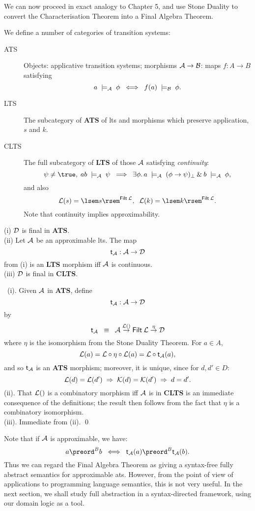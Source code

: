 We can now proceed in exact analogy to Chapter 5, and use Stone Duality to convert the Characterisation Theorem into a Final Algebra Theorem.
\begin{definition}
{\rm We define a number of categories of transition systems:
\begin{description}
\item[ATS] Objects: applicative transition systems; morphisms ${\cal A} \rightarrow {\cal B}$: maps $f : A \rightarrow B$ satisfying
\[ a \; \models_{\cal A} \; \phi \;\; \Longleftrightarrow \;\; f(a) \; \models_{\cal B} \; \phi . \]
\item[LTS] The subcategory of {\bf ATS} of lts and morphisms which preserve application, $s$ and $k$.
\item[CLTS] The full subcategory of {\bf LTS} of those $\cal A$ satisfying {\em continuity}:
\[ \psi \neq \true , \; a b \; \models_{\cal A} \; \psi \;\; \Longrightarrow \;\; \exists \phi . \, a \; \models_{\cal A} \; (\phi \rightarrow \psi )_{\bot} \: \& 
\: b \; \models_{\cal A} \; \phi , \]
and also
\[ {\cal L}(s) = \lsem s \rsem^{{\sf Filt} \: {\cal L}} , \;\; {\cal L}(k) = \lsem k \rsem^{{\sf Filt} \: {\cal L}} . \]
Note that continuity implies approximability.
\end{description}}
\end{definition}
\begin{theorem}
(i) $\cal D$ is final in {\bf ATS}. \\
(ii) Let $\cal A$ be an approximable lts. The map
\[ {\sf t}_{\cal A} : {\cal A} \rightarrow {\cal D} \]
from (i) is an {\bf LTS} morphism iff $\cal A$ is continuous. \\
(iii) $\cal D$ is final in {\bf CLTS}.
\end{theorem}

\proof\  (i). Given $\cal A$ in {\bf ATS}, define
\[ {\sf t}_{\cal A} : {\cal A} \rightarrow {\cal D} \]
by
\[ {\sf t}_{\cal A} \;\; \equiv \;\; {\cal A} \stackrel{{\cal L}()}{\rightarrow} {\sf Filt} \: {\cal L} \stackrel{\eta}{\rightarrow} {\cal D} \]
where $\eta$ is the isomorphism from the Stone Duality Theorem. For $a \in A$,
\[ {\cal L}(a) = {\cal L} \circ \eta \circ {\cal L}(a) = {\cal L} \circ {\sf t}_{\cal A}(a) , \]
and so ${\sf t}_{\cal A}$ is an {\bf ATS} morphism; moreover, it is unique, since for $d, d' \in D$:
\[ {\cal L}(d) = {\cal L}(d') \; \Rightarrow \; {\cal K}(d) = {\cal K}(d') \; \Rightarrow \; d = d' . \]
(ii). That ${\cal L} ()$ is a combinatory morphism iff $\cal A$ is in {\bf CLTS} is an immediate consequence of the definitions; the result then follows from the fact that $\eta$ is a combinatory isomorphism. \\
(iii). Immediate from (ii). \qed

Note that if $\cal A$ is approximable, we have:
\[ a \preord^{B} b \;\; \Longleftrightarrow \;\; {\sf t}_{\cal A}(a) \preord^{B} {\sf t}_{\cal A}(b) . \]
Thus we can regard the Final Algebra Theorem as giving a syntax-free fully abstract semantics for approximable ats. 
However, from the point of view of applications to programming language semantics, this is not very useful.  
In the next section, we shall study full abstraction in a syntax-directed framework, using our domain logic as a tool.

